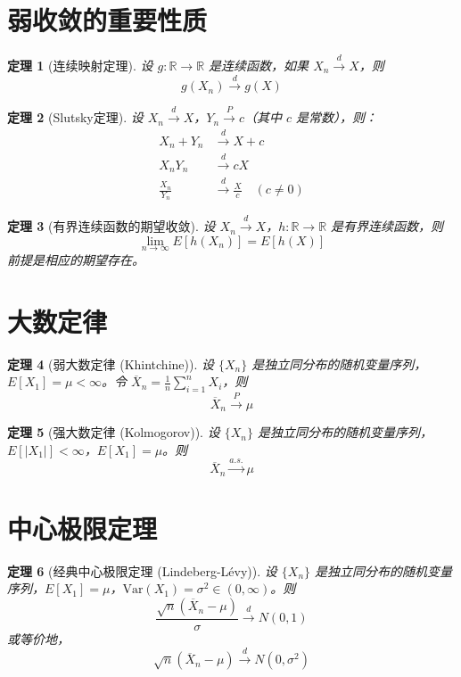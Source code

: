 \documentclass[12pt]{article}
\newtheorem{theorem}{定理}
\begin{document}
\section{弱收敛的重要性质}

\begin{theorem}[连续映射定理]
设 $g: \mathbb{R} \to \mathbb{R}$ 是连续函数，如果 $X_n \xrightarrow{d} X$，则
$$g(X_n) \xrightarrow{d} g(X)$$
\end{theorem}

\begin{theorem}[Slutsky定理]
设 $X_n \xrightarrow{d} X$，$Y_n \xrightarrow{P} c$（其中 $c$ 是常数），则：
\begin{align}
X_n + Y_n &\xrightarrow{d} X + c \\
X_n Y_n &\xrightarrow{d} cX \\
\frac{X_n}{Y_n} &\xrightarrow{d} \frac{X}{c} \quad (c \neq 0)
\end{align}
\end{theorem}

\begin{theorem}[有界连续函数的期望收敛]
设 $X_n \xrightarrow{d} X$，$h: \mathbb{R} \to \mathbb{R}$ 是有界连续函数，则
$$\lim_{n \to \infty} E[h(X_n)] = E[h(X)]$$
前提是相应的期望存在。
\end{theorem}

\section{大数定律}

\begin{theorem}[弱大数定律 (Khintchine)]
设 $\{X_n\}$ 是独立同分布的随机变量序列，$E[X_1] = \mu < \infty$。令 $\overline{X}_n = \frac{1}{n}\sum_{i=1}^n X_i$，则
$$\overline{X}_n \xrightarrow{P} \mu$$
\end{theorem}

\begin{theorem}[强大数定律 (Kolmogorov)]
设 $\{X_n\}$ 是独立同分布的随机变量序列，$E[|X_1|] < \infty$，$E[X_1] = \mu$。则
$$\overline{X}_n \xrightarrow{a.s.} \mu$$
\end{theorem}

\section{中心极限定理}

\begin{theorem}[经典中心极限定理 (Lindeberg-Lévy)]
设 $\{X_n\}$ 是独立同分布的随机变量序列，$E[X_1] = \mu$，$\text{Var}(X_1) = \sigma^2 \in (0, \infty)$。则
$$\frac{\sqrt{n}(\overline{X}_n - \mu)}{\sigma} \xrightarrow{d} N(0,1)$$
或等价地，
$$\sqrt{n}(\overline{X}_n - \mu) \xrightarrow{d} N(0, \sigma^2)$$
\end{theorem}
\end{document}
